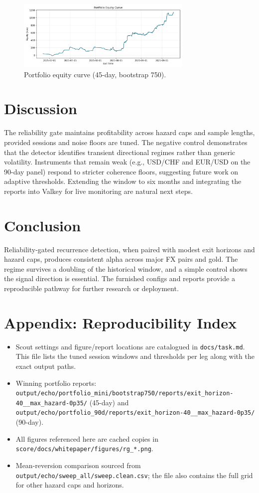 \documentclass[11pt]{article}
\begin{document}
\begin{figure}[t]
  \centering
  \includegraphics[width=0.75\textwidth]{figures/rg_equity_curve.png}
  \caption{Portfolio equity curve (45-day, bootstrap 750).}
  \label{fig:equity}
\end{figure}

\section{Discussion}
The reliability gate maintains profitability across hazard caps and sample lengths, provided sessions and noise floors are tuned. The negative control demonstrates that the detector identifies transient directional regimes rather than generic volatility. Instruments that remain weak (e.g., USD/CHF and EUR/USD on the 90-day panel) respond to stricter coherence floors, suggesting future work on adaptive thresholds. Extending the window to six months and integrating the reports into Valkey for live monitoring are natural next steps.

\section{Conclusion}
Reliability-gated recurrence detection, when paired with modest exit horizons and hazard caps, produces consistent alpha across major FX pairs and gold. The regime survives a doubling of the historical window, and a simple control shows the signal direction is essential. The furnished configs and reports provide a reproducible pathway for further research or deployment.

\section*{Appendix: Reproducibility Index}
\begin{itemize}
  \item Scout settings and figure/report locations are catalogued in \texttt{docs/task.md}. This file lists the tuned session windows and thresholds per leg along with the exact output paths.
  \item Winning portfolio reports: \texttt{output/echo/portfolio\_mini/bootstrap750/reports/exit\_horizon-40\_\_max\_hazard-0p35/} (45-day) and \texttt{output/echo/portfolio\_90d/reports/exit\_horizon-40\_\_max\_hazard-0p35/} (90-day).
  \item All figures referenced here are cached copies in \texttt{score/docs/whitepaper/figures/rg\_*.png}.
  \item Mean-reversion comparison sourced from \texttt{output/echo/sweep\_all/sweep.clean.csv}; the file also contains the full grid for other hazard caps and horizons.
\end{itemize}
\end{document}
